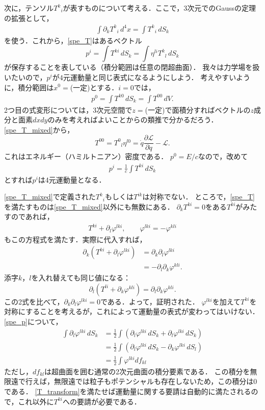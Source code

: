 \documentclass[a4paper]{ltjsreport}
\begin{document}
次に，テンソル${T^k}_i$が表すものについて考える．ここで，$3$次元でのGaussの定理の拡張として，
\begin{align}
  \int\partial_k{T^k}_i\,d^4x=\int{}{T^k}_i\,dS_k
\end{align}
を使う．これから，\eqref{spe_T}はあるベクトル
\[p^i=\int{T^{ki}}\,dS_k=\int\eta^{li}{{T^k}_l}\,dS_k\]
が保存することを表している（積分範囲は任意の閉超曲面）．
我々は力学場を扱いたいので，$p^i$が$4$元運動量と同じ表式になるようにしよう．
考えやすいように，積分範囲は$x^0=$(一定)とする．$i=0$では，
\begin{align}
  p^0=\int{T^{k0}}\,dS_k=\int{T^{00}}\,dV .
\end{align}
2つ目の式変形については，3次元空間で$z=$(一定)で面積分すればベクトルの$z$成分と面素$dxdy$のみを考えればよいことからの類推で分かるだろう．
\eqref{spe_T_mixed}から，
\[ T^{00}={T^0}_l\eta^{l0}=\dot{q}\frac{\partial{\mathcal{L}}}{\partial\dot{q}} - \mathcal{L} . \]
これはエネルギー（ハミルトニアン）密度である．
$p^0=E/c$なので，改めて
\begin{align}
  p^i=\frac{1}{c}\int{T^{ki}}\,dS_k\label{spe_p}
\end{align}
とすれば$p^i$は4元運動量となる．

\eqref{spe_T_mixed}で定義された${T^k}_i$もしくは$T^{ik}$は対称でない．
ところで，\eqref{spe_T}を満たすものは\eqref{spe_T_mixed}以外にも無数にある．
$\partial_kT^{ki}=0$をある$T^{ki}$がみたすのであれば，
\begin{align}
  T^{ki} + \partial_l\varphi^{lki},\qquad\varphi^{lki}= - \varphi^{kli}\label{T_transform}
\end{align}
もこの方程式を満たす．実際に代入すれば，
\begin{align*}
  \partial_k\left(T^{ki} + \partial_l\varphi^{lki}\right) &= \partial_k\partial_l\varphi^{lki}\\
  &=  - \partial_l\partial_k\varphi^{kli} .
\end{align*}
添字$k$，$l$を入れ替えても同じ値になる：
\[\partial_l\left(T^{li} + \partial_k\varphi^{kli}\right)=\partial_l\partial_k\varphi^{kli}.\]
この2式を比べて，$\partial_k\partial_l\varphi^{lki}=0$である．よって，証明された．
$\varphi^{lki}$を加えて$T^{ki}$を対称にすることを考えるが，これによって運動量の表式が変わってはいけない．
\eqref{spe_p}について，
\begin{align*}
  \int\partial_l\varphi^{lki}\,dS_k &= \frac{1}{2}\int\left(\partial_l\varphi^{lki}\,dS_k + \partial_l\varphi^{lki}\,dS_k\right)\\
  &= \frac{1}{2}\int\left(\partial_l\varphi^{lki}\,dS_k - \partial_k\varphi^{lki}\,dS_l\right)\\
  &= \frac{1}{2}\int\varphi^{lki}df_{kl}
\end{align*}
ただし，$df_{kl}$は超曲面を囲む通常の2次元曲面の積分要素である．
この積分を無限遠で行えば，無限遠では粒子もポテンシャルも存在しないため，この積分は$0$である．
\eqref{T_transform}を満たせば運動量に関する要請は自動的に満たされるので，これ以外に$T^{ki}$への要請が必要である．
\end{document}
